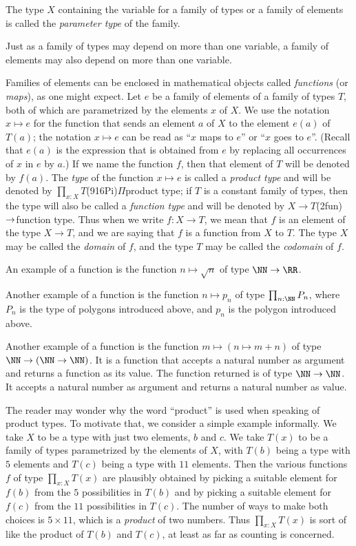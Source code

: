 The type $X$ containing the variable for a family of types or a family of elements is called the \emph{parameter type} of
the family. 

Just as a family of types may depend on more than one variable, a family of elements may also depend on more than one variable.

Families of elements can be enclosed in mathematical objects called \emph{functions} (or \emph{maps}), as one might
expect.
Let $e$ be a family of elements of a family of types $T$,
both of which are parametrized by the elements $x$ of $X$.  We use the notation $x \mapsto e$ for the function that sends an element $a$ of $X$
to the element $e(a)$ of $T(a)$; the notation $x \mapsto e$ can be read as ``$x$ maps to $e$'' or ``$x$ goes to $e$''.  (Recall that $e(a)$ is
the expression that is obtained from $e$ by replacing all occurrences of $x$ in $e$ by $a$.)  If we name the function $f$, then that element of
$T$ will be denoted by $f(a)$.  The \emph{type} of the function $x \mapsto e$ is called a \emph{product type} and will be denoted by
$\prod_{x:X} T$\glossary(916Pi){$\Pi$}{product type}; if $T$ is a constant family of types, then the type will also be
called a \emph{function type} and will be denoted by $X \to T$\glossary(2fun){$\protect\to$}{function type}.  Thus when we write $f : X \to T$,
we mean that $f$ is an element of the type $X \to T$, and we are saying that $f$ is a function from $X$ to $T$.  The type $X$ may be called the
\emph{domain} of $f$, and the type $T$ may be called the \emph{codomain} of $f$.

An example of a function is the function $n \mapsto \sqrt n$ of type $\NN \to \RR$.

Another example of a function is the function $n \mapsto p_n$ of type $\prod_{n:\NN} P_n$, where $P_n$ is the type of polygons introduced above,
and $p_n$ is the polygon introduced above.

Another example of a function is the function $m \mapsto (n \mapsto m+n)$ of type $\NN \to (\NN \to \NN)$.  It is a function that accepts a
natural number as argument and returns a function as its value.  The function returned is of type $\NN \to \NN$.  It accepts a natural number
as argument and returns a natural number as value.

The reader may wonder why the word ``product'' is used when speaking of product types.  To motivate that, we consider a simple example
informally.  We take $X$ to be a type with just two elements, $b$ and $c$.  We take $T(x)$ to be a family of types parametrized by the elements
of $X$, with $T(b)$ being a type with $5$ elements and $T(c)$ being a type with $11$ elements.  Then the various functions $f$ of type
$\prod_{x:X} T(x)$ are plausibly obtained by picking a suitable element for $f(b)$ from the $5$ possibilities in $T(b)$ and by picking a
suitable element for $f(c)$ from the $11$ possibilities in $T(c)$.  The number of ways to make both choices is $5 \times 11$, which is a
\emph{product} of two numbers.  Thus $\prod_{x:X} T(x)$ is sort of like the product of $T(b)$ and $T(c)$, at least as far as counting is
concerned.

